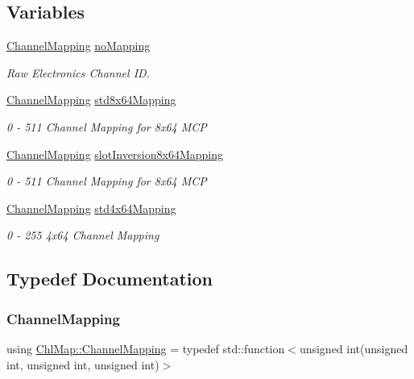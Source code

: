 \subsection*{Variables}
\begin{DoxyCompactItemize}
\item 
\hyperlink{namespace_chl_map_a02f93d10e11f82c0ea2330212cf70545}{Channel\+Mapping} \hyperlink{namespace_chl_map_a5912e55252670a1e71857a1374bbfa1a}{no\+Mapping}
\begin{DoxyCompactList}\small\item\em Raw Electronics Channel ID. \end{DoxyCompactList}\item 
\hyperlink{namespace_chl_map_a02f93d10e11f82c0ea2330212cf70545}{Channel\+Mapping} \hyperlink{namespace_chl_map_a615e236287cdfca8b2521b4280e3c972}{std8x64\+Mapping}
\begin{DoxyCompactList}\small\item\em 0 -\/ 511 Channel Mapping for 8x64 M\+CP \end{DoxyCompactList}\item 
\hyperlink{namespace_chl_map_a02f93d10e11f82c0ea2330212cf70545}{Channel\+Mapping} \hyperlink{namespace_chl_map_ab1f62d041d8393301f88f6290753a519}{slot\+Inversion8x64\+Mapping}
\begin{DoxyCompactList}\small\item\em 0 -\/ 511 Channel Mapping for 8x64 M\+CP \end{DoxyCompactList}\item 
\hyperlink{namespace_chl_map_a02f93d10e11f82c0ea2330212cf70545}{Channel\+Mapping} \hyperlink{namespace_chl_map_a12fcd0b1200b8a5db9a23360a588719d}{std4x64\+Mapping}
\begin{DoxyCompactList}\small\item\em 0 -\/ 255 4x64 Channel Mapping \end{DoxyCompactList}\end{DoxyCompactItemize}


\subsection{Typedef Documentation}
\mbox{\label{namespace_chl_map_a02f93d10e11f82c0ea2330212cf70545}} 
\subsubsection{\texorpdfstring{Channel\+Mapping}{ChannelMapping}}
{\footnotesize\ttfamily using \hyperlink{namespace_chl_map_a02f93d10e11f82c0ea2330212cf70545}{Chl\+Map\+::\+Channel\+Mapping} = typedef std\+::function$<$unsigned int(unsigned int, unsigned int, unsigned int)$>$}



